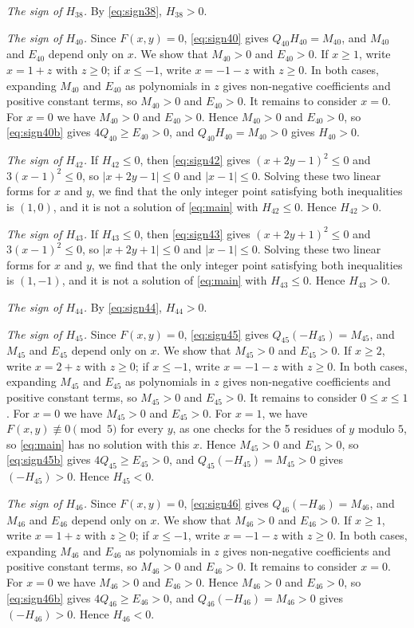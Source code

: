 \documentclass[11pt]{article}
\begin{document}
\emph{The sign of $H_{38}$.} By \eqref{eq:sign38}, $H_{38}>0$.

\emph{The sign of $H_{40}$.} Since $F(x,y)=0$, \eqref{eq:sign40} gives $Q_{40}H_{40}=M_{40}$, and $M_{40}$ and $E_{40}$ depend only on $x$. We show that $M_{40}>0$ and $E_{40}>0$. If $x\geq1$, write $x=1+z$ with $z\geq0$; if $x\leq-1$, write $x=-1-z$ with $z\geq0$. In both cases, expanding $M_{40}$ and $E_{40}$ as polynomials in $z$ gives non-negative coefficients and positive constant terms, so $M_{40}>0$ and $E_{40}>0$. It remains to consider $x=0$. For $x=0$ we have $M_{40}>0$ and $E_{40}>0$. Hence $M_{40}>0$ and $E_{40}>0$, so \eqref{eq:sign40b} gives $4Q_{40}\geq E_{40}>0$, and $Q_{40}H_{40}=M_{40}>0$ gives $H_{40}>0$.

\emph{The sign of $H_{42}$.} If $H_{42}\leq0$, then \eqref{eq:sign42} gives $(x+2y-1)^2\leq 0$ and $3(x-1)^2\leq 0$, so $|x+2y-1|\leq0$ and $|x-1|\leq0$. Solving these two linear forms for $x$ and $y$, we find that the only integer point satisfying both inequalities is $(1,0)$, and it is not a solution of \eqref{eq:main} with $H_{42}\leq0$. Hence $H_{42}>0$.

\emph{The sign of $H_{43}$.} If $H_{43}\leq0$, then \eqref{eq:sign43} gives $(x+2y+1)^2\leq 0$ and $3(x-1)^2\leq 0$, so $|x+2y+1|\leq0$ and $|x-1|\leq0$. Solving these two linear forms for $x$ and $y$, we find that the only integer point satisfying both inequalities is $(1,-1)$, and it is not a solution of \eqref{eq:main} with $H_{43}\leq0$. Hence $H_{43}>0$.

\emph{The sign of $H_{44}$.} By \eqref{eq:sign44}, $H_{44}>0$.

\emph{The sign of $H_{45}$.} Since $F(x,y)=0$, \eqref{eq:sign45} gives $Q_{45}(-H_{45})=M_{45}$, and $M_{45}$ and $E_{45}$ depend only on $x$. We show that $M_{45}>0$ and $E_{45}>0$. If $x\geq2$, write $x=2+z$ with $z\geq0$; if $x\leq-1$, write $x=-1-z$ with $z\geq0$. In both cases, expanding $M_{45}$ and $E_{45}$ as polynomials in $z$ gives non-negative coefficients and positive constant terms, so $M_{45}>0$ and $E_{45}>0$. It remains to consider $0\leq x\leq1$. For $x=0$ we have $M_{45}>0$ and $E_{45}>0$. For $x=1$, we have $F(x,y)\not\equiv0\pmod{5}$ for every $y$, as one checks for the 5 residues of $y$ modulo $5$, so \eqref{eq:main} has no solution with this $x$. Hence $M_{45}>0$ and $E_{45}>0$, so \eqref{eq:sign45b} gives $4Q_{45}\geq E_{45}>0$, and $Q_{45}(-H_{45})=M_{45}>0$ gives $(-H_{45})>0$. Hence $H_{45}<0$.

\emph{The sign of $H_{46}$.} Since $F(x,y)=0$, \eqref{eq:sign46} gives $Q_{46}(-H_{46})=M_{46}$, and $M_{46}$ and $E_{46}$ depend only on $x$. We show that $M_{46}>0$ and $E_{46}>0$. If $x\geq1$, write $x=1+z$ with $z\geq0$; if $x\leq-1$, write $x=-1-z$ with $z\geq0$. In both cases, expanding $M_{46}$ and $E_{46}$ as polynomials in $z$ gives non-negative coefficients and positive constant terms, so $M_{46}>0$ and $E_{46}>0$. It remains to consider $x=0$. For $x=0$ we have $M_{46}>0$ and $E_{46}>0$. Hence $M_{46}>0$ and $E_{46}>0$, so \eqref{eq:sign46b} gives $4Q_{46}\geq E_{46}>0$, and $Q_{46}(-H_{46})=M_{46}>0$ gives $(-H_{46})>0$. Hence $H_{46}<0$.
\end{document}
